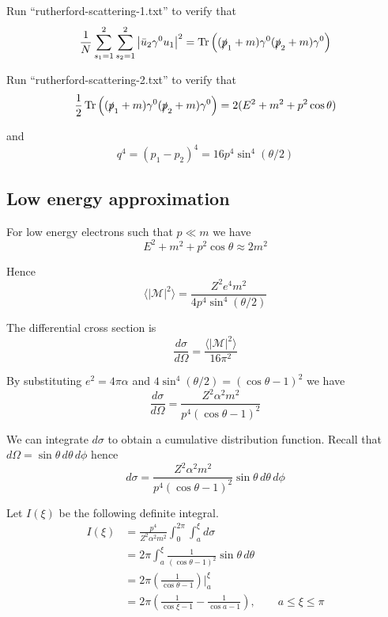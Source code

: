 \documentclass[12pt]{article}
\begin{document}
\noindent
Run ``rutherford-scattering-1.txt'' to verify that
$$
\frac{1}{N}\sum_{s_1=1}^2\sum_{s_2=1}^2\left|\bar{u}_2\gamma^0 u_1\right|^2
=\mathop{\rm Tr}\left((\slashed{p}_1+m)\gamma^0(\slashed{p}_2+m)\gamma^0\right)
$$

\noindent
Run ``rutherford-scattering-2.txt'' to verify that
$$
\frac{1}{2}
\mathop{\rm Tr}\left((\slashed{p}_1+m)\gamma^0(\slashed{p}_2+m)\gamma^0\right)
=2(E^2+m^2+p^2\cos\theta)
$$

\noindent
and
\begin{equation*}
q^4=(p_1-p_2)^4=16p^4\sin^4(\theta/2)
\end{equation*}

\subsection*{Low energy approximation}
For low energy electrons such that $p\ll m$ we have
\begin{equation*}
E^2+m^2+p^2\cos\theta\approx2m^2
\end{equation*}

\noindent
Hence
\begin{equation*}
\langle|\mathcal{M}|^2\rangle=\frac{Z^2e^4m^2}{4p^4\sin^4(\theta/2)}
\end{equation*}

\noindent
The differential cross section is
\begin{equation*}
\frac{d\sigma}{d\Omega}=\frac{\langle|\mathcal{M}|^2\rangle}{16\pi^2}
\end{equation*}

\noindent
By substituting $e^2=4\pi\alpha$ and $4\sin^4(\theta/2)=(\cos\theta-1)^2$ we have
\begin{equation*}
\frac{d\sigma}{d\Omega}
=\frac{Z^2\alpha^2m^2}{p^4(\cos\theta-1)^2}
\end{equation*}

\noindent
We can integrate $d\sigma$ to obtain a cumulative distribution function.
Recall that $d\Omega=\sin\theta\,d\theta\,d\phi$ hence
\begin{equation*}
d\sigma=\frac{Z^2\alpha^2m^2}{p^4(\cos\theta-1)^2}\sin\theta\,d\theta\,d\phi
\end{equation*}

\noindent
Let $I(\xi)$ be the following definite integral.
\begin{align*}
I(\xi)&=\frac{p^4}{Z^2\alpha^2m^2}\int_0^{2\pi}\int_a^\xi d\sigma
\\
&=2\pi\int_a^\xi\frac{1}{(\cos\theta-1)^2}\sin\theta\,d\theta
\\
&=2\pi\left(\frac{1}{\cos\theta-1}\right)\bigg|_a^\xi
\\
&=2\pi\left(\frac{1}{\cos\xi-1}-\frac{1}{\cos a-1}\right),\qquad a\le\xi\le\pi
\end{align*}
\end{document}

